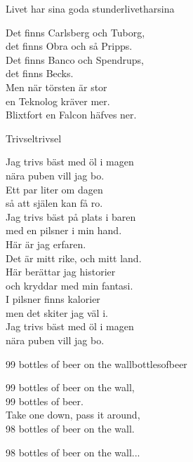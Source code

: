 \begin{song}{Livet har sina goda stunder}{livetharsina}
\begin{vers}
Det finns Carlsberg och Tuborg,\\
det finns Obra och så Pripps.\\
Det finns Banco och Spendrups,\\
det finns Becks.\\
Men när törsten är stor\\
en Teknolog kräver mer.\\
Blixtfort en Falcon häfves ner.\\
\end{vers}
\end{song}

\newpage

\begin{song}{Trivsel}{trivsel}
\begin{vers}
Jag trivs bäst med öl i magen\\
nära puben vill jag bo.\\
Ett par liter om dagen\\
så att själen kan få ro.\\
Jag trivs bäst på plats i baren\\
med en pilsner i min hand.\\
Här är jag erfaren.\\
Det är mitt rike, och mitt land.\\
Här berättar jag historier\\
och kryddar med min fantasi.\\
I pilsner finns kalorier\\
men det skiter jag väl i.\\
Jag trivs bäst med öl i magen\\
nära puben vill jag bo.\\
\end{vers}
\end{song}


\begin{song}{99 bottles of beer on the wall}{bottlesofbeer}
\begin{vers}
99 bottles of beer on the wall,\\ 
99 bottles of beer.\\
Take one down, pass it around, \\
98 bottles of beer on the wall.\\
\end{vers}
\begin{vers}
98 bottles of beer on the wall...\\
\end{vers}
\end{song}


